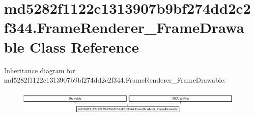 \hypertarget{classmd5282f1122c1313907b9bf274dd2c2f344_1_1FrameRenderer__FrameDrawable}{}\section{md5282f1122c1313907b9bf274dd2c2f344.\+Frame\+Renderer\+\_\+\+Frame\+Drawable Class Reference}
\label{classmd5282f1122c1313907b9bf274dd2c2f344_1_1FrameRenderer__FrameDrawable}
Inheritance diagram for md5282f1122c1313907b9bf274dd2c2f344.\+Frame\+Renderer\+\_\+\+Frame\+Drawable\+:\begin{figure}[H]
\begin{center}
\leavevmode
\includegraphics[height=1.250000cm]{classmd5282f1122c1313907b9bf274dd2c2f344_1_1FrameRenderer__FrameDrawable}
\end{center}
\end{figure}
